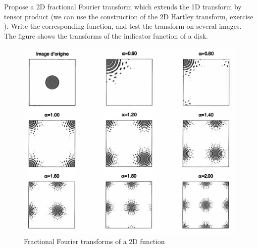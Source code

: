  
\begin{exo}
\label{exo-transforme-fourier-fractionionnaire-2d}
 
Propose a 2D fractional Fourier transform which extends the 1D transform by tensor product (we can use the construction of the 2D Hartley transform, exercise ). Write the corresponding \Matlab{} function, and test the transform on several images. The figure  shows the transforms of the indicator function of a disk.
 
\begin{figure}[ht] 
    \begin{center}
    \includegraphics[scale=0.7]{images/transformee-fourier-fractionnaire-2d}
    \end{center}
    \caption{Fractional Fourier transforms of a 2D function}
              \label{fig-transforme-fourier-fractionionnaire-2d}
\end{figure}
\end{exo}
 